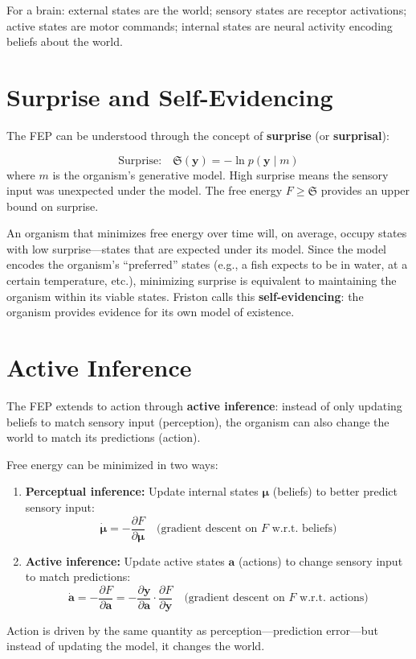 \documentclass[11pt,a4paper]{report}
\begin{document}
For a brain: external states are the world; sensory states are receptor activations; active states are motor commands; internal states are neural activity encoding beliefs about the world.

\section{Surprise and Self-Evidencing}

The FEP can be understood through the concept of \textbf{surprise} (or \textbf{surprisal}):

\begin{mathbox}
\vspace{-8pt}
\[
  \text{Surprise:}\quad \mathfrak{S}(\mathbf{y}) = -\ln p(\mathbf{y} \mid m)
\]
where $m$ is the organism's generative model. High surprise means the sensory input was unexpected under the model. The free energy $F \geq \mathfrak{S}$ provides an upper bound on surprise.
\vspace{-4pt}
\end{mathbox}

An organism that minimizes free energy over time will, on average, occupy states with low surprise---states that are expected under its model. Since the model encodes the organism's ``preferred'' states (e.g., a fish expects to be in water, at a certain temperature, etc.), minimizing surprise is equivalent to maintaining the organism within its viable states. Friston calls this \textbf{self-evidencing}: the organism provides evidence for its own model of existence.

\section{Active Inference}

The FEP extends to action through \textbf{active inference}: instead of only updating beliefs to match sensory input (perception), the organism can also change the world to match its predictions (action).

\begin{fepbox}
Free energy can be minimized in two ways:
\begin{enumerate}[leftmargin=1.5em]
  \item \textbf{Perceptual inference:} Update internal states $\boldsymbol{\mu}$ (beliefs) to better predict sensory input:
  \[
    \dot{\boldsymbol{\mu}} = -\frac{\partial F}{\partial \boldsymbol{\mu}} \quad\text{(gradient descent on } F \text{ w.r.t.\ beliefs)}
  \]
  \item \textbf{Active inference:} Update active states $\mathbf{a}$ (actions) to change sensory input to match predictions:
  \[
    \dot{\mathbf{a}} = -\frac{\partial F}{\partial \mathbf{a}} = -\frac{\partial \mathbf{y}}{\partial \mathbf{a}} \cdot \frac{\partial F}{\partial \mathbf{y}} \quad\text{(gradient descent on } F \text{ w.r.t.\ actions)}
  \]
\end{enumerate}
Action is driven by the same quantity as perception---prediction error---but instead of updating the model, it changes the world.
\end{fepbox}
\end{document}
